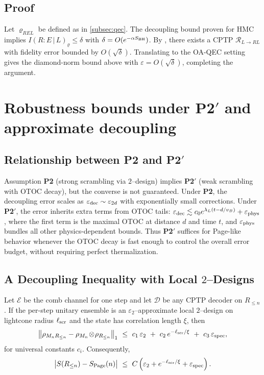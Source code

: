 \documentclass[aps,prd,preprint,onecolumn,superscriptaddress,nofootinbib,longbibliography,floatfix,11pt,showpacs,showkeys]{revtex4-2}
\newcommand{\Ptwo}{\textbf{P2}\xspace}
\newcommand{\PtwoPrime}{\textbf{P2$'$}\xspace}
\newcommand{\HMC}{\textsc{HMC}\xspace}
\theoremstyle{plain}
\theoremstyle{definition}
\theoremstyle{remark}
\begin{document}
\subsection{Proof}
Let $\varrho_{REL}$ be defined as in \cref{subsec:qec}.
The decoupling bound proven for \HMC{} implies $I(R{:}E\,|\,L)_{\varrho}\le \delta$ with $\delta=O(e^{-\alpha S_{\rm BH}})$.
By \cite{FawziRenner:2015}, there exists a CPTP $\mathcal{R}_{L\to RL}$ with fidelity error bounded by $O(\sqrt{\delta})$.
Translating to the OA-QEC setting gives the diamond-norm bound above with $\varepsilon=O(\sqrt{\delta})$, completing the argument.

\section{Robustness bounds under \texorpdfstring{\PtwoPrime}{P2'} and approximate decoupling}

\label{app:robustness} %

\subsection{Relationship between \Ptwo{} and \texorpdfstring{\PtwoPrime}{P2'}}
Assumption \Ptwo{} (strong scrambling via $2$--design) implies \PtwoPrime{} (weak scrambling with OTOC decay), but the converse is not guaranteed. Under \Ptwo{}, the decoupling error scales as $\varepsilon_{\rm dec} \sim \varepsilon_{2d}$ with exponentially small corrections. Under \PtwoPrime{}, the error inherits extra terms from OTOC tails: $\varepsilon_{\rm dec} \lesssim c_0 e^{\lambda_L(t - d/v_B)} + \varepsilon_{\rm phys}$, where the first term is the maximal OTOC at distance $d$ and time $t$, and $\varepsilon_{\rm phys}$ bundles all other physics-dependent bounds. Thus \PtwoPrime{} suffices for Page-like behavior whenever the OTOC decay is fast enough to control the overall error budget, without requiring perfect thermalization.

\subsection{A Decoupling Inequality with Local \texorpdfstring{$2$}{2}--Designs}
Let $\mathcal{E}$ be the comb channel for one step and let $\mathcal{D}$ be any CPTP decoder on $R_{\le n}$. If the per-step unitary ensemble is an $\varepsilon_2$--approximate local $2$--design on lightcone radius $\ell_{\rm scr}$ and the state has correlation length $\xi$, then
\begin{equation}
\left\| \rho_{M_n R_{\le n}} - \rho_{M_n}\!\otimes\!\rho_{R_{\le n}} \right\|_1 \ \le\ c_1\,\varepsilon_2\ +\ c_2\,e^{-\ell_{\rm scr}/\xi}\ +\ c_3\,\varepsilon_{\rm spec},
\end{equation}
for universal constants $c_i$. Consequently,
\begin{equation}
\big| S(R_{\le n}) - S_{\rm Page}(n) \big| \ \le\ C\left(\varepsilon_2 + e^{-\ell_{\rm scr}/\xi} + \varepsilon_{\rm spec}\right).
\end{equation}
\end{document}
